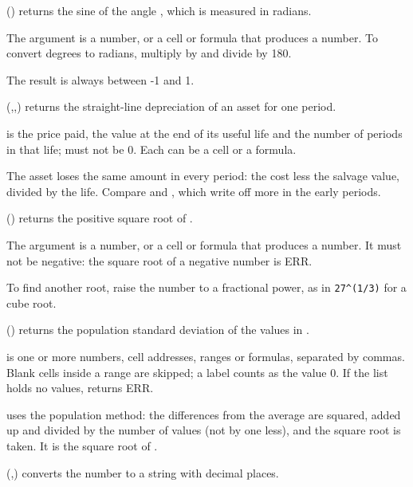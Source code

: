() returns the sine of the angle , which is measured in radians.

The argument  is a number, or a cell or formula that produces a number. To convert degrees to radians, multiply by  and divide by 180.

The result is always between -1 and 1.

\Examples
{}

(,,) returns the straight-line depreciation of an asset for one period.

 is the price paid,  the value at the end of its useful life and  the number of periods in that life;  must not be 0. Each can be a cell or a formula.

The asset loses the same amount in every period: the cost less the salvage value, divided by the life. Compare  and , which write off more in the early periods.

\Examples
{}

() returns the positive square root of .

The argument  is a number, or a cell or formula that produces a number. It must not be negative: the square root of a negative number is ERR.

To find another root, raise the number to a fractional power, as in \texttt{27\^{}(1/3)} for a cube root.

\Examples
{}

() returns the population standard deviation of the values in .

 is one or more numbers, cell addresses, ranges or formulas, separated by commas. Blank cells inside a range are skipped; a label counts as the value 0. If the list holds no values,  returns ERR.

 uses the population method: the differences from the average are squared, added up and divided by the number of values (not by one less), and the square root is taken. It is the square root of .

\Examples
{}

(,) converts the number  to a string with  decimal places.

